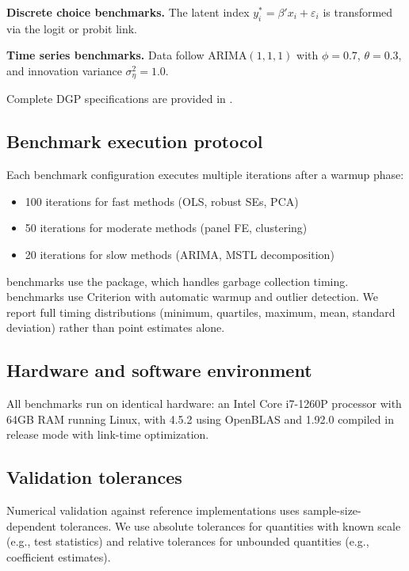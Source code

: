 \textbf{Discrete choice benchmarks.} The latent index
$y^*_i = \beta' x_i + \varepsilon_i$ is transformed via the logit or probit link.

\textbf{Time series benchmarks.} Data follow ARIMA$(1,1,1)$ with $\phi = 0.7$,
$\theta = 0.3$, and innovation variance $\sigma^2_\eta = 1.0$.

Complete DGP specifications are provided in
.

\subsection{Benchmark execution protocol}

Each benchmark configuration executes multiple iterations after a warmup phase:
\begin{itemize}
  \item 100 iterations for fast methods (OLS, robust SEs, PCA)
  \item 50 iterations for moderate methods (panel FE, clustering)
  \item 20 iterations for slow methods (ARIMA, MSTL decomposition)
\end{itemize}

 benchmarks use the  package, which handles garbage
collection timing.  benchmarks use Criterion with automatic
warmup and outlier detection. We report full timing distributions (minimum,
quartiles, maximum, mean, standard deviation) rather than point estimates alone.

\subsection{Hardware and software environment}

All benchmarks run on identical hardware: an Intel Core i7-1260P processor
with 64GB RAM running Linux, with  4.5.2 using OpenBLAS and
 1.92.0 compiled in release mode with link-time optimization.

\subsection{Validation tolerances} \label{app:validation-tolerances}

Numerical validation against  reference implementations uses
sample-size-dependent tolerances. We use absolute tolerances for quantities
with known scale (e.g., test statistics) and relative tolerances for
unbounded quantities (e.g., coefficient estimates).

